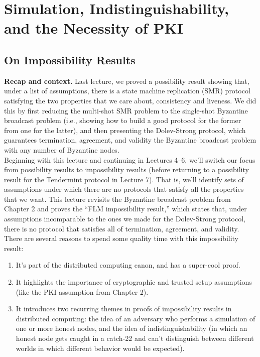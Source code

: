 \chapter{Simulation, Indistinguishability, and the Necessity of PKI}
\section{On Impossibility Results}
\textbf{Recap and context.} Last lecture, we proved a possibility result showing that, under a
list of assumptions, there is a state machine replication (SMR) protocol satisfying the two
properties that we care about, consistency and liveness. We did this by first reducing the
multi-shot SMR problem to the single-shot Byzantine broadcast problem (i.e., showing how
to build a good protocol for the former from one for the latter), and then presenting the
Dolev-Strong protocol, which guarantees termination, agreement, and validity the Byzantine
broadcast problem with any number of Byzantine nodes.\\
Beginning with this lecture and continuing in Lectures 4–6, we’ll switch our focus from
possibility results to impossibility results (before returning to a possibility result for the
Tendermint protocol in Lecture 7). That is, we’ll identify sets of assumptions under which
there are no protocols that satisfy all the properties that we want. This lecture revisits
the Byzantine broadcast problem from Chapter 2 and proves the “FLM impossibility result,”
which states that, under assumptions incomparable to the ones we made for the Dolev-Strong
protocol, there is no protocol that satisfies all of termination, agreement, and validity. There
are several reasons to spend some quality time with this impossibility result:
\begin{enumerate}
    \item It’s part of the distributed computing canon, and has a super-cool proof.
    \item It highlights the importance of cryptographic and trusted setup assumptions (like the
PKI assumption from Chapter 2).
    \item It introduces two recurring themes in proofs of impossibility results in distributed
computing: the idea of an adversary who performs a simulation of one or more honest
nodes, and the idea of indistinguishability (in which an honest node gets caught in
a catch-22 and can’t distinguish between different worlds in which different behavior
would be expected).
\end{enumerate}

